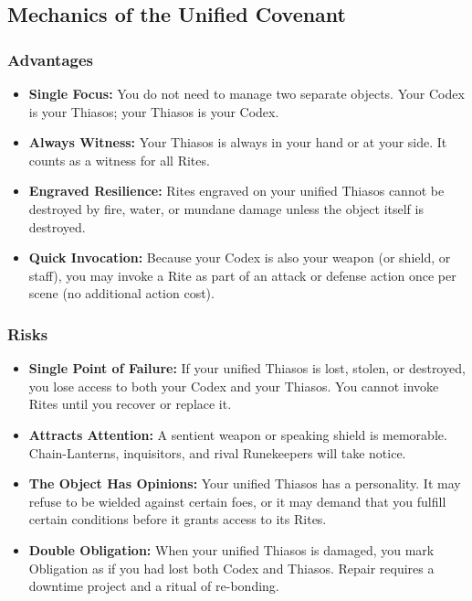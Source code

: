 \subsection{Mechanics of the Unified Covenant}

\subsubsection{Advantages}

\begin{itemize}
\item \textbf{Single Focus:} You do not need to manage two separate objects. Your Codex is your Thiasos; your Thiasos is your Codex.
\item \textbf{Always Witness:} Your Thiasos is always in your hand or at your side. It counts as a witness for all Rites.
\item \textbf{Engraved Resilience:} Rites engraved on your unified Thiasos cannot be destroyed by fire, water, or mundane damage unless the object itself is destroyed.
\item \textbf{Quick Invocation:} Because your Codex is also your weapon (or shield, or staff), you may invoke a Rite as part of an attack or defense action once per scene (no additional action cost).
\end{itemize}

\subsubsection{Risks}

\begin{itemize}
\item \textbf{Single Point of Failure:} If your unified Thiasos is lost, stolen, or destroyed, you lose access to both your Codex and your Thiasos. You cannot invoke Rites until you recover or replace it.
\item \textbf{Attracts Attention:} A sentient weapon or speaking shield is memorable. Chain-Lanterns, inquisitors, and rival Runekeepers will take notice.
\item \textbf{The Object Has Opinions:} Your unified Thiasos has a personality. It may refuse to be wielded against certain foes, or it may demand that you fulfill certain conditions before it grants access to its Rites.
\item \textbf{Double Obligation:} When your unified Thiasos is damaged, you mark Obligation as if you had lost both Codex and Thiasos. Repair requires a downtime project and a ritual of re-bonding.
\end{itemize}

